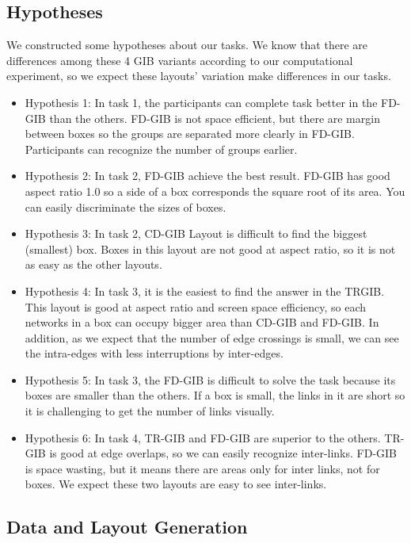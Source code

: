 \documentclass{llncs}
\begin{document}
\subsection{Hypotheses}
We constructed some hypotheses about our tasks.
We know that there are differences among these 4 GIB variants according to our computational experiment, so we expect these layouts' variation make differences in our tasks.


\begin{itemize}
\item Hypothesis 1: In task 1, the participants can complete task better in the FD-GIB than the others.
FD-GIB is not space efficient, but there are margin between boxes so the groups are separated more clearly in FD-GIB.
Participants can recognize the number of groups earlier.

\item Hypothesis 2: In task 2, FD-GIB achieve the best result.
FD-GIB has good aspect ratio 1.0 so a side of a box corresponds the square root of its area.
You can easily discriminate the sizes of boxes.

\item Hypothesis 3: In task 2, CD-GIB Layout is difficult to find the biggest (smallest) box.
Boxes in this layout are not good at aspect ratio, so it is not as easy as the other layouts.


\item Hypothesis 4: In task 3, it is the easiest to find the answer in the TRGIB.
This layout is good at aspect ratio and screen space efficiency, so each networks in a box can occupy bigger area than CD-GIB and FD-GIB.
In addition, as we expect that the number of edge crossings is small, we can see the intra-edges with less interruptions by inter-edges.

\item Hypothesis 5: In task 3, the FD-GIB is difficult to solve the task because its boxes are smaller than the others.
If a box is small, the links in it are short so it is challenging to get the number of links visually.

\item Hypothesis 6: In task 4, TR-GIB and FD-GIB are superior to the others.
TR-GIB is good at edge overlaps, so we can easily recognize inter-links.
FD-GIB is space wasting, but it means there are areas only for inter links, not for boxes.
We expect these two layouts are easy to see inter-links.
\end{itemize}


\subsection{Data and Layout Generation}
\end{document}
